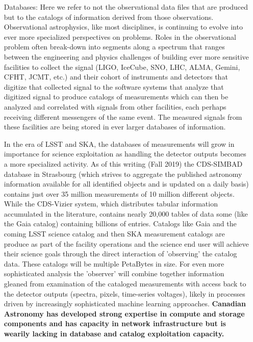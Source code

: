 \documentclass[11pt]{article}
\begin{document}
\begin{itemize}
    \item[Databases:] Here we refer to not the observational data files that are produced but to the catalogs of information derived from those observations.  Observational astrophysics, like most disciplines, is continuing to evolve into ever more specialized perspectives on problems. Roles in the observational problem often break-down into segments along a spectrum that ranges between the engineering and physics challenges of building ever more sensitive facilities to collect the signal (LIGO, IceCube, SNO, LHC, ALMA, Gemini, CFHT, JCMT, etc.) and their cohort of instruments and detectors that digitize that collected signal to the software systems that analyze that digitized signal to produce catalogs of measurements which can then be analyzed and correlated with signals from other facilities, each perhaps receiving different messengers of the same event. The measured signals from these facilities are being stored in ever larger databases of information. 
    
     In the era of LSST and SKA, the databases of measurements will grow in importance for science exploitation as handling the detector outputs becomes a more specialized activity.
    As of this writing (Fall 2019) the CDS-SIMBAD database in Strasbourg (which strives to aggregate the published astronomy information available for all identified objects and is updated on a daily basis) contains just over 35 million measurements of 10 million different objects.  While the CDS-Vizier system, which distributes tabular information accumulated in the literature, contains nearly 20,000 tables of data some (like the Gaia catalog) containing billions of entries.  Catalogs like Gaia and the coming LSST science catalog and then SKA measurement catalogs are produce as part of the facility operations and the science end user will achieve their science goals through the direct interaction of 'observing' the catalog data.  These catalogs will be multiple PetaBytes in size.  For even more sophisticated analysis the 'observer' will combine together information gleaned from examination of the cataloged measurements with access back to the detector outputs (spectra, pixels, time-series voltages), likely in processes driven by increasingly sophisticated machine learning approaches.  {\bf Canadian Astronomy has developed strong expertise in compute and storage components and has capacity in network infrastructure but is wearily lacking in database and catalog exploitation capacity. } 
 

\end{itemize}
\end{document}

